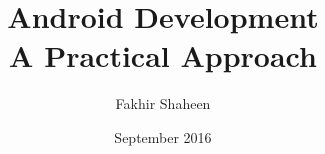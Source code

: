 
\author{Fakhir Shaheen}
\title{Android Development \\ A Practical Approach}
\date{September 2016}

\frontmatter
\maketitle
\tableofcontents

\mainmatter


